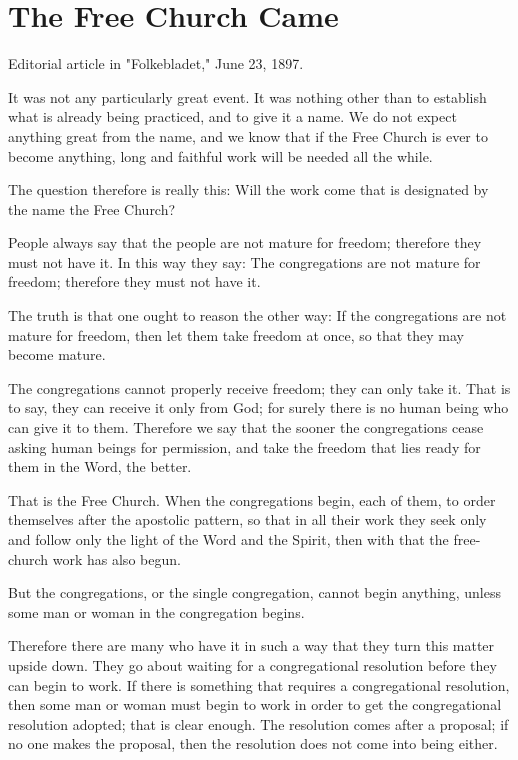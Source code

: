 
\section{The Free Church Came}

Editorial article in "Folkebladet," June 23, 1897.

It was not any particularly great event. It was nothing other than to establish what is already being practiced, and to give it a name. We do not expect anything great from the name, and we know that if the Free Church is ever to become anything, long and faithful work will be needed all the while.

The question therefore is really this: Will the work come that is designated by the name the Free Church?

People always say that the people are not mature for freedom; therefore they must not have it. In this way they say: The congregations are not mature for freedom; therefore they must not have it.

The truth is that one ought to reason the other way: If the congregations are not mature for freedom, then let them take freedom at once, so that they may become mature.

The congregations cannot properly receive freedom; they can only take it. That is to say, they can receive it only from God; for surely there is no human being who can give it to them. Therefore we say that the sooner the congregations cease asking human beings for permission, and take the freedom that lies ready for them in the Word, the better.

That is the Free Church. When the congregations begin, each of them, to order themselves after the apostolic pattern, so that in all their work they seek only and follow only the light of the Word and the Spirit, then with that the free-church work has also begun.

But the congregations, or the single congregation, cannot begin anything, unless some man or woman in the congregation begins.

Therefore there are many who have it in such a way that they turn this matter upside down. They go about waiting for a congregational resolution before they can begin to work. If there is something that requires a congregational resolution, then some man or woman must begin to work in order to get the congregational resolution adopted; that is clear enough. The resolution comes after a proposal; if no one makes the proposal, then the resolution does not come into being either.

